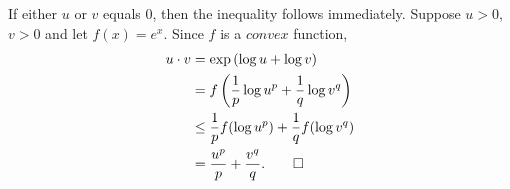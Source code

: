 
\begin{solution}
    If either $u$ or $v$ equals $0$, then the inequality
    follows immediately. Suppose $u>0$, $v>0$ and let
    $f(x) = e^x$. Since $f$ is a $convex$ function,
    \begin{align*}
        u\cdot v &= \exp\left({\log{u}+\log{v}}\right)\\
        &= f\left(\frac{1}{p}\log{u^p} +\frac{1}{q}
        \log{v^q}\right)\\
        &\leq \frac{1}{p}f(\log{u^p})+\frac{1}{q}f(\log{v^q})\\
        &= \frac{u^p}{p}+\frac{v^q}{q}.\qed
    \end{align*}
\end{solution}